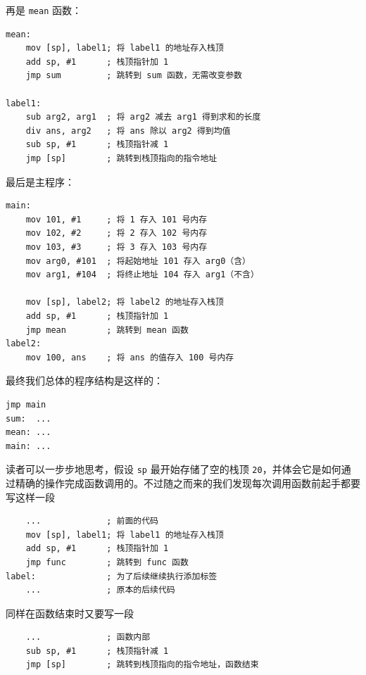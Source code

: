 再是 \texttt{mean} 函数：
\begin{verbatim}
mean:
    mov [sp], label1; 将 label1 的地址存入栈顶
    add sp, #1      ; 栈顶指针加 1
    jmp sum         ; 跳转到 sum 函数，无需改变参数

label1:
    sub arg2, arg1  ; 将 arg2 减去 arg1 得到求和的长度
    div ans, arg2   ; 将 ans 除以 arg2 得到均值
    sub sp, #1      ; 栈顶指针减 1
    jmp [sp]        ; 跳转到栈顶指向的指令地址
\end{verbatim}

最后是主程序：
\begin{verbatim}
main:
    mov 101, #1     ; 将 1 存入 101 号内存
    mov 102, #2     ; 将 2 存入 102 号内存
    mov 103, #3     ; 将 3 存入 103 号内存
    mov arg0, #101  ; 将起始地址 101 存入 arg0（含）
    mov arg1, #104  ; 将终止地址 104 存入 arg1（不含）

    mov [sp], label2; 将 label2 的地址存入栈顶
    add sp, #1      ; 栈顶指针加 1
    jmp mean        ; 跳转到 mean 函数
label2:
    mov 100, ans    ; 将 ans 的值存入 100 号内存
\end{verbatim}

最终我们总体的程序结构是这样的：
\begin{verbatim}
jmp main
sum:  ...
mean: ...
main: ...
\end{verbatim}

读者可以一步步地思考，假设 \texttt{sp} 最开始存储了空的栈顶 \texttt{20}，并体会它是如何通过精确的操作完成函数调用的。不过随之而来的我们发现每次调用函数前起手都要写这样一段
\begin{verbatim}
    ...             ; 前面的代码
    mov [sp], label1; 将 label1 的地址存入栈顶
    add sp, #1      ; 栈顶指针加 1
    jmp func        ; 跳转到 func 函数
label:              ; 为了后续继续执行添加标签
    ...             ; 原本的后续代码
\end{verbatim}

同样在函数结束时又要写一段
\begin{verbatim}
    ...             ; 函数内部
    sub sp, #1      ; 栈顶指针减 1
    jmp [sp]        ; 跳转到栈顶指向的指令地址，函数结束
\end{verbatim}

